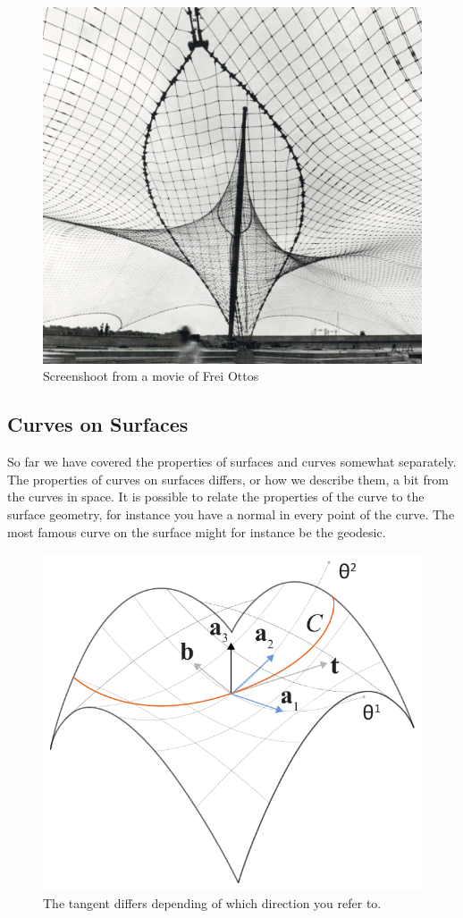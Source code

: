 \begin{figure}[H] 
\centering
\includegraphics[width=0.9\linewidth ]{figure/Theory/FreiOtto.jpg}
\caption{Screenshoot from a movie of Frei Ottos}
\end{figure}



\subsection{Curves on Surfaces}

So far we have covered the properties of surfaces and curves somewhat separately. The properties of curves on surfaces differs, or how we describe them, a bit from the curves in  space. It is possible to relate the properties of the curve to the surface geometry, for instance you have a normal in every point of the curve. The most famous curve on the surface might for instance be the geodesic.

\begin{figure}[H]
\centering
\includegraphics[width=0.7\linewidth ]{figure/Theory/CurveOnSurface.pdf}
\caption{The tangent differs depending of which direction you refer to. }
\end{figure}



